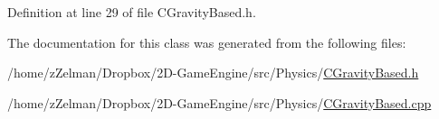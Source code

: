 Definition at line 29 of file C\-Gravity\-Based.\-h.



The documentation for this class was generated from the following files\-:\begin{DoxyCompactItemize}
\item 
/home/z\-Zelman/\-Dropbox/2\-D-\/\-Game\-Engine/src/\-Physics/\hyperlink{CGravityBased_8h}{C\-Gravity\-Based.\-h}\item 
/home/z\-Zelman/\-Dropbox/2\-D-\/\-Game\-Engine/src/\-Physics/\hyperlink{CGravityBased_8cpp}{C\-Gravity\-Based.\-cpp}\end{DoxyCompactItemize}
